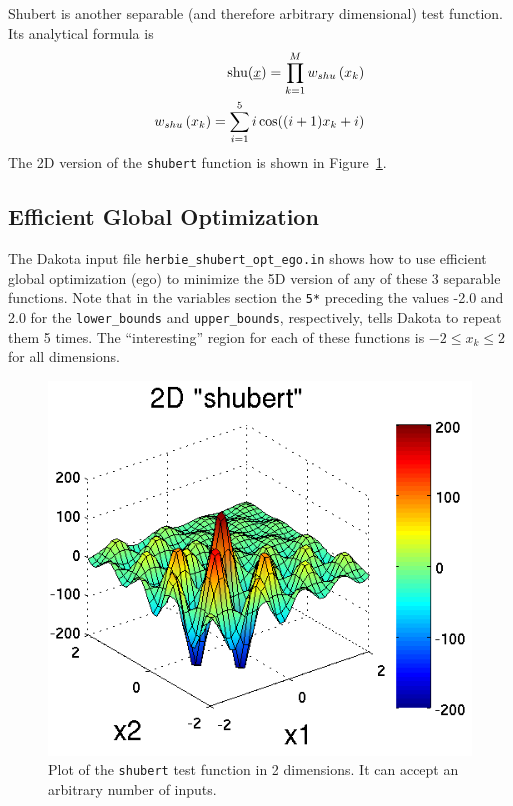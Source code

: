 Shubert is another separable (and therefore arbitrary dimensional) 
test function. Its analytical formula is
\begin{eqnarray*}
{\rm shu}(\underline{x})= \prod_{k=1}^M w_{shu}\left(x_k\right) \\
w_{shu}\left(x_k\right)= \sum_{i=1}^5 i\cos((i+1)x_k+i)
\end{eqnarray*}
The 2D version of the \texttt{shubert} function is shown in 
Figure~\ref{fig:2D_shubert}. 

\subsection{Efficient Global Optimization}

The Dakota input file \texttt{herbie\_shubert\_opt\_ego.in} shows how
to use efficient global optimization (ego) to minimize the 5D version
of any of these 3 separable functions. Note that in the variables
section the \texttt{5*} preceding the values -2.0 and 2.0 for the
\texttt{lower\_bounds} and \texttt{upper\_bounds}, respectively, tells
Dakota to repeat them 5 times. The ``interesting'' region for each 
of these functions is $-2\le x_k \le 2$ for all dimensions.
\begin{center}
  \begin{small}
    \begin{bigbox}
    \end{bigbox}
  \end{small}
  \label{additional:herbie_shubert_ego}
\end{center}

\begin{figure}
  \centering
  \centerline{\includegraphics[scale=1.0]{images/DAK5pt2_2D_shubert}}
  \caption{Plot of the \texttt{shubert} test function in 2 dimensions.
           It can accept an arbitrary number of inputs.}
  \label{fig:2D_shubert}
\end{figure}

